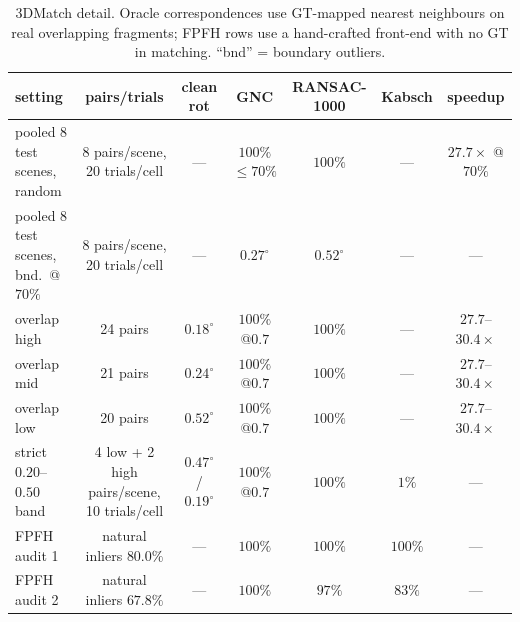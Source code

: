 \begin{table}[t]
\caption{3DMatch detail. Oracle correspondences use GT-mapped nearest neighbours on real overlapping
fragments; FPFH rows use a hand-crafted front-end with no GT in matching. ``bnd'' = boundary
outliers.}
\label{tab:3dmatch}
\centering
\scriptsize
\setlength{\tabcolsep}{2.2pt}
\begin{tabular}{lcccccc}
\toprule
setting & pairs/trials & clean rot & GNC & RANSAC-1000 & Kabsch & speedup \\
\midrule
pooled 8 test scenes, random & 8 pairs/scene, 20 trials/cell & --- & $100\%$ $\le70\%$ & $100\%$ & --- & $27.7\times$ @$70\%$ \\
pooled 8 test scenes, bnd.\ @$70\%$ & 8 pairs/scene, 20 trials/cell & --- & $0.27^\circ$ & $0.52^\circ$ & --- & --- \\
overlap high & 24 pairs & $0.18^\circ$ & $100\%$ @$0.7$ & $100\%$ & --- & $27.7$--$30.4\times$ \\
overlap mid & 21 pairs & $0.24^\circ$ & $100\%$ @$0.7$ & $100\%$ & --- & $27.7$--$30.4\times$ \\
overlap low & 20 pairs & $0.52^\circ$ & $100\%$ @$0.7$ & $100\%$ & --- & $27.7$--$30.4\times$ \\
strict $0.20$--$0.50$ band & 4 low + 2 high pairs/scene, 10 trials/cell & $0.47^\circ$ / $0.19^\circ$ & $100\%$ @$0.7$ & $100\%$ & $1\%$ & --- \\
FPFH audit 1 & natural inliers $80.0\%$ & --- & $100\%$ & $100\%$ & $100\%$ & --- \\
FPFH audit 2 & natural inliers $67.8\%$ & --- & $100\%$ & $97\%$ & $83\%$ & --- \\
\bottomrule
\end{tabular}
\end{table}

